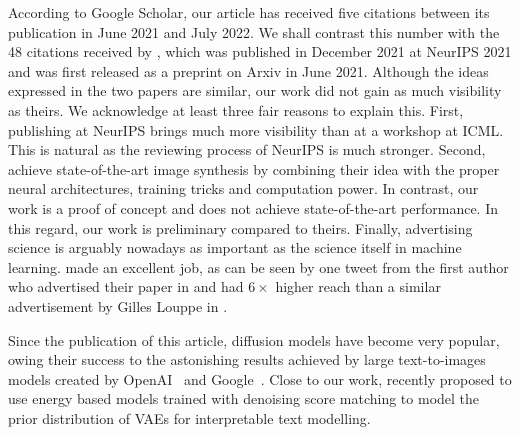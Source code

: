 According to Google Scholar, our article has received five citations between its publication in June 2021 and July 2022. We shall contrast this number with the 48 citations received by \citet{vahdat2021score}, which was published in December 2021 at NeurIPS 2021 and was first released as a preprint on Arxiv in June 2021. Although the ideas expressed in the two papers are similar, our work did not gain as much visibility as theirs. We acknowledge at least three fair reasons to explain this. First, publishing at NeurIPS brings much more visibility than at a workshop at ICML. This is natural as the reviewing process of NeurIPS is much stronger. Second, \citet{vahdat2021score} achieve state-of-the-art image synthesis by combining their idea with the proper neural architectures, training tricks and computation power.
In contrast, our work is a proof of concept and does not achieve state-of-the-art performance. In this regard, our work is preliminary compared to theirs. Finally, advertising science is arguably nowadays as important as the science itself in machine learning.\citet{vahdat2021score} made an excellent job, as can be seen by one tweet from the first author who advertised their paper in  and had $6\times$ higher reach than a similar advertisement by Gilles Louppe in .

Since the publication of this article, diffusion models have become very popular, owing their success to the astonishing results achieved by large text-to-images models created by OpenAI~\citep[$\text{DALL}\cdot\text{E} 2$][]{ramesh2022hierarchical} and Google~\citep[Imagen][]{saharia2022photorealistic}. Close to our work, \citet{yu2022latent} recently proposed to use energy based models trained with denoising score matching to model the prior distribution of VAEs for interpretable text modelling.

